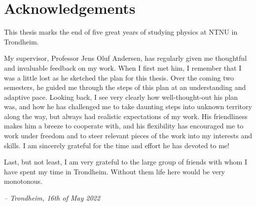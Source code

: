 \chapter*{Acknowledgements}

This thesis marks the end of five great years of studying physics at NTNU in Trondheim.

My supervisor, Professor Jens Oluf Andersen,
has regularly given me thoughtful and invaluable feedback on my work.
When I first met him,
I remember that I was a little lost as he sketched the plan for this thesis.
Over the coming two semesters, he guided me through the steps of this plan at an understanding and adaptive pace.
Looking back, I see very clearly how well-thought-out his plan was,
and how he has challenged me to take daunting steps into unknown territory along the way,
but always had realistic expectations of my work.
His friendliness makes him a breeze to cooperate with,
and his flexibility has encouraged me to work under freedom and to steer relevant pieces of the work into my interests and skills.
I am sincerely grateful for the time and effort he has devoted to me!

Last, but not least, I am very grateful to the large group of friends with whom I have spent my time in Trondheim.
Without them life here would be very monotonous.

\null\hfill \textit{-- Trondheim, 16th of May 2022}
